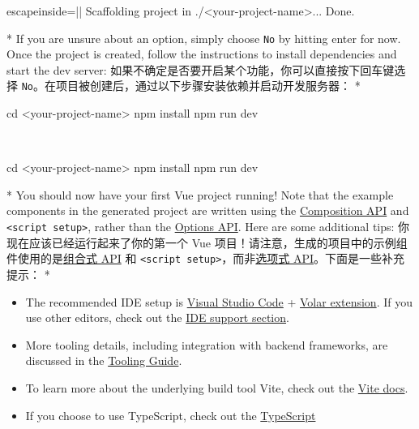 \begin{paracol}{2}
\begin{codeConsole*}{escapeinside=||}
Scaffolding project in ./<your-project-name>...
Done.
\end{codeConsole*} 
\switchcolumn[0]*%
If you are unsure about an option, simply choose \texttt{No} by hitting
enter for now. Once the project is created, follow the instructions to
install dependencies and start the dev server:
\switchcolumn
如果不确定是否要开启某个功能，你可以直接按下回车键选择
\texttt{No}。在项目被创建后，通过以下步骤安装依赖并启动开发服务器：
\switchcolumn[0]*%
~\begin{codeShellMul}
cd <your-project-name>
npm install
npm run dev
\end{codeShellMul}
\switchcolumn
~\begin{codeShellMul}
cd <your-project-name>
npm install
npm run dev
\end{codeShellMul}
\switchcolumn[0]*%
You should now have your first Vue project running! Note that the
example components in the generated project are written using the
\href{https://vuejs.org/guide/introduction.html\#composition-api}{Composition
API} and \texttt{\textless{}script\ setup\textgreater{}}, rather than
the
\href{https://vuejs.org/guide/introduction.html\#options-api}{Options
API}. Here are some additional tips:
\switchcolumn
你现在应该已经运行起来了你的第一个 Vue
项目！请注意，生成的项目中的示例组件使用的是\href{https://cn.vuejs.org/guide/introduction.html\#composition-api}{组合式
API} 和
\texttt{\textless{}script\ setup\textgreater{}}，而非\href{https://cn.vuejs.org/guide/introduction.html\#options-api}{选项式
API}。下面是一些补充提示：
\switchcolumn[0]*%
\begin{itemize}
    \item
      The recommended IDE setup is
      \href{https://code.visualstudio.com/}{Visual Studio Code} +
      \href{https://marketplace.visualstudio.com/items?itemName=Vue.volar}{Volar
      extension}. If you use other editors, check out the
      \href{https://vuejs.org/guide/scaling-up/tooling.html\#ide-support}{IDE
      support section}.
    \item
      More tooling details, including integration with backend frameworks,
      are discussed in the
      \href{https://vuejs.org/guide/scaling-up/tooling.html}{Tooling Guide}.
    \item
      To learn more about the underlying build tool Vite, check out the
      \href{https://vitejs.dev/}{Vite docs}.
    \item
      If you choose to use TypeScript, check out the
      \href{https://vuejs.org/guide/typescript/overview.html}{TypeScript
}
\end{itemize}
\end{paracol}
